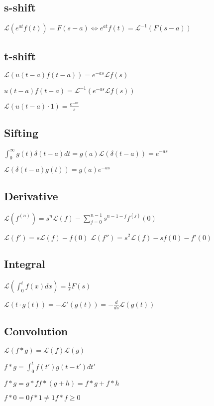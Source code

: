 \documentclass[10pt,a4paper]{scrartcl}
\renewcommand{\L}{\mathscr{L}}
\begin{document}
\begin{multicols*}{3}
\begin{enumerate}
	\end{enumerate}
	
	\subsection{s-shift}
	$\L(e^{at}f(t))=F(s-a)\Leftrightarrow e^{at}f(t)=\L^{-1}(F(s-a))$
	
	\subsection{t-shift}
	
  	$\L(u(t-a)f(t-a))=e^{-as}\L f(s)$
	
	$u(t-a)f(t-a)=\L^{-1}(e^{-as}\L f(s))$

	$\L(u(t-a)\cdot 1)=\frac{e^{-as}}{s}$	
	
	\subsection{Sifting}
	
	$\int_0^\infty{g(t)\delta(t-a)dt}=g(a)$\hfill$\L(\delta(t-a))=e^{-as}$
	
	$\L(\delta(t-a)g(t))=g(a)e^{-as}$
	
	\subsection{Derivative}
	
	$\L(f^{(n)})=s^n\L(f)-\sum_{j=0}^{n-1}{s^{n-1-j}f^{(j)}(0)}$	
	
	$\L(f')=s\L(f)-f(0)$ \hfill $\L(f'')=s^2\L(f)-sf(0)-f'(0)$
	
	\subsection{Integral}
	
	$\L(\int_0^t{f(x)dx})=\frac{1}{s}F(s)$
	
	$\L(t\cdot g(t))=-\L '(g(t))=-\frac{d}{ds}\L(g(t))$
	
	\subsection{Convolution}
	
	$\L(f\ast g)=\L(f)\L(g)$
	
	$f\ast g=\int_0^t{f(t')g(t-t')dt'}$
	
	$f\ast g=g\ast f$\hfill$f\ast(g+h)=f\ast g+f\ast h$
	
	$f\ast 0 = 0$\hfill$f\ast 1 \neq 1$\hfill$f\ast f\geq 0$
	

\end{multicols*}
\end{document}
